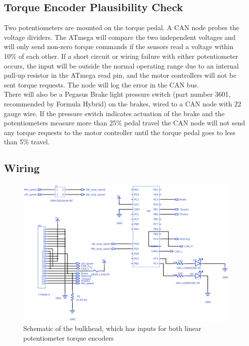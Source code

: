 \documentclass{article}
\begin{document}
    \subsection{Torque Encoder Plausibility Check}


        Two potentiometers are mounted on the torque pedal. A CAN node probes the voltage dividers. The ATmega will compare the two independent voltages and will only send non-zero torque commands if the sensors read a voltage within 10\% of each other. If a short circuit or wiring failure with either potentiometer occurs, the input will be outside the normal operating range due to an internal pull-up resistor in the ATmega read pin, and the motor controllers will not be sent torque requests. The node will log the error in the CAN bus.\\

        There will also be a Pegasus Brake light pressure switch (part number 3601, recommended by Formula Hybrid) on the brakes, wired to a CAN node with 22 gauge wire. If the pressure switch indicates actuation of the brake and the potentiometers measure more than 25\% pedal travel the CAN node will not send any torque requests to the motor controller until the torque pedal goes to less than 5\% travel.

    \subsection{Wiring}


        \begin{figure}[H]
            \centering
            \includegraphics[width = 0.7 \textwidth]{Bulkheadschem}
            \caption{Schematic of the bulkhead, which has inputs for both linear potentiometer torque encoders}
            \label{bulkheadschem}
        \end{figure}
\end{document}
